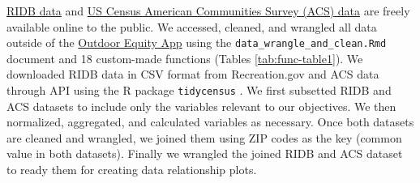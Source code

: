 \documentclass[
]{book}
\begin{document}
\href{https://ridb.recreation.gov/}{RIDB data} and \href{https://www.census.gov/programs-surveys/acs/data.html}{US Census American Communities Survey (ACS) data} are freely available online to the public. We accessed, cleaned, and wrangled all data outside of the \href{https://shinyapps.bren.ucsb.edu/oe_app/}{Outdoor Equity App} using the \texttt{data\_wrangle\_and\_clean.Rmd} document and 18 custom-made functions (Tables \ref{tab:func-table1}). We downloaded RIDB data in CSV format from Recreation.gov and ACS data through API using the R package \texttt{tidycensus} \citep{R-tidycensus}. We first subsetted RIDB and ACS datasets to include only the variables relevant to our objectives. We then normalized, aggregated, and calculated variables as necessary. Once both datasets are cleaned and wrangled, we joined them using ZIP codes as the key (common value in both datasets). Finally we wrangled the joined RIDB and ACS dataset to ready them for creating data relationship plots.
\end{document}
